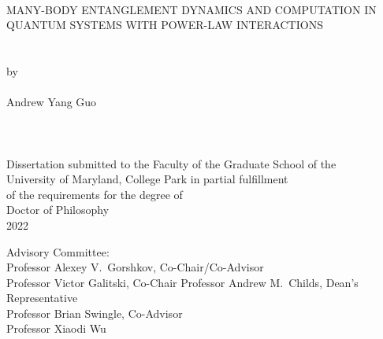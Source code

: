 \hbox{\ }
\vspace{1in}
\begin{center}

\large{{MANY-BODY ENTANGLEMENT DYNAMICS AND COMPUTATION IN QUANTUM SYSTEMS WITH POWER-LAW INTERACTIONS}}\\
\ \\
\ \\
\large{by} \\
\ \\
\large{Andrew Yang Guo}%
\ \\
\ \\
\ \\
\ \\
\normalsize
Dissertation submitted to the Faculty of the Graduate School of the \\
University of Maryland, College Park in partial fulfillment \\
of the requirements for the degree of \\
Doctor of Philosophy \\
2022
\end{center}

\vspace{7.5em}

\noindent Advisory Committee: \\
Professor Alexey V.\ Gorshkov, Co-Chair/Co-Advisor \\
Professor Victor Galitski, Co-Chair
Professor Andrew M.\ Childs, Dean's Representative \\
Professor Brian Swingle, Co-Advisor\\
Professor Xiaodi Wu
